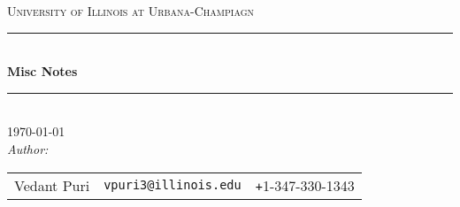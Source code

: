 %
\begin{titlepage}
\newcommand{\HRule}{\rule{\linewidth}{0.5mm}}
\center
\textsc{\LARGE University of Illinois at Urbana-Champiagn}\\[1cm]
\HRule \\[0.4cm]

{ 
  \huge \bfseries Misc Notes \\[0.5cm]
}

\HRule \\[1cm]
{\Large \today}\\[1cm]
\emph{Author:}\\
\begin{tabular}{l r l}
  Vedant Puri         & \texttt{vpuri3@illinois.edu}  &  \texttt{+}1-347-330-1343 \\
\end{tabular}\\[0.5cm]
\vfill
\end{titlepage}